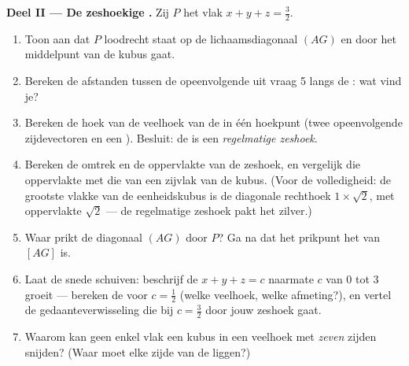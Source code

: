\begin{problem}
\medskip
\noindent\textbf{Deel II --- De zeshoekige .}
Zij $P$ het vlak $x + y + z = \frac32$.
\begin{enumerate}[resume]
  \item Toon aan dat $P$ loodrecht staat op de lichaamsdiagonaal $(AG)$ en
        door het middelpunt van de kubus gaat.
  \item Bereken de afstanden tussen de opeenvolgende  uit vraag 5 langs
        de : wat vind je?
  \item Bereken de hoek van de veelhoek van de  in één hoekpunt (twee
        opeenvolgende zijdevectoren en een ). Besluit: de
         is een \emph{regelmatige zeshoek}.
  \item Bereken de omtrek en de oppervlakte van de zeshoek, en vergelijk die
        oppervlakte met die van een zijvlak van de kubus. (Voor de
        volledigheid: de grootste vlakke  van de eenheidskubus is de
        diagonale rechthoek $1 \times \sqrt2$, met oppervlakte $\sqrt2$ --- de
        regelmatige zeshoek pakt het zilver.)
  \item Waar prikt de diagonaal $(AG)$ door $P$? Ga na dat het prikpunt het
         van $[AG]$ is.
  \item Laat de snede schuiven: beschrijf de  $x + y + z = c$
        naarmate $c$ van $0$ tot $3$ groeit --- bereken de  voor
        $c = \frac12$ (welke veelhoek, welke afmeting?), en vertel de
        gedaanteverwisseling die bij $c = \frac32$ door jouw zeshoek gaat.
  \item Waarom kan geen enkel vlak een kubus in een veelhoek met \emph{zeven}
        zijden snijden? (Waar moet elke zijde van de  liggen?)
\end{enumerate}


\end{problem}
